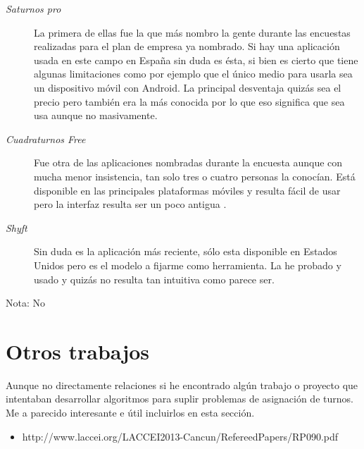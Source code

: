 \begin{description}
	\item[\emph{Saturnos pro}] La primera de ellas fue la que más nombro la gente durante las encuestas realizadas para el plan de empresa ya nombrado. Si hay una aplicación usada en este campo en España sin duda es ésta, si bien es cierto que tiene algunas limitaciones como por ejemplo que el único medio para usarla sea un dispositivo móvil con Android. La principal desventaja quizás sea el precio pero también era la más conocida por lo que eso significa que sea usa aunque no masivamente.
	\item[\emph{Cuadraturnos Free}] Fue otra de las aplicaciones nombradas durante la encuesta aunque con mucha menor insistencia, tan solo tres o cuatro personas la conocían. Está disponible en las principales plataformas móviles y resulta fácil de usar pero la interfaz resulta ser un poco antigua .
	\item[\emph{Shyft}] Sin duda es la aplicación más reciente, sólo esta disponible en Estados Unidos pero es el modelo a fijarme como herramienta. La he probado y usado y quizás no resulta tan intuitiva como parece ser.
\end{description}

Nota: No

\section{Otros trabajos}
Aunque no directamente relaciones si he encontrado algún trabajo o proyecto que intentaban desarrollar algoritmos para suplir problemas de asignación de turnos. Me a parecido interesante e útil incluirlos en esta sección.
     \begin{itemize}
         \item http://www.laccei.org/LACCEI2013-Cancun/RefereedPapers/RP090.pdf
    \end{itemize}

